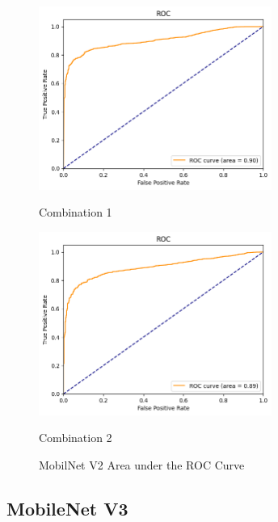 \begin{figure}[H]
    \centering
    \begin{minipage}[b]{0.49\textwidth}
        \centering
        \includegraphics[width=\textwidth, height=6cm]{Figures/unbalanced_data/without bn/mn2/roc.png}
        \captionsetup{labelformat=empty}
        \caption{Combination 1}
        \label{fig:u_wo_r_roc}
    \end{minipage}
    \hfill
    \begin{minipage}[b]{0.49\textwidth}
        \centering
        \includegraphics[width=\textwidth, height=6cm]{Figures/unbalanced_data/with bn/mn2/roc.png}
        \captionsetup{labelformat=empty}
        \caption{Combination 2}
        \label{fig:u_w_r_roc}
    \end{minipage}
    \captionsetup{labelformat=default}
    \caption{MobilNet V2 Area under the ROC Curve}
\end{figure}

\subsection{MobileNet V3}

